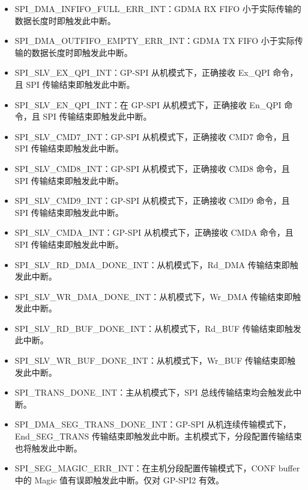 \documentclass[main\_\_CN.tex]{subfiles}
\begin{document}
\begin{itemize}
\item \label{int:SPIINFIFOFULLERRINT}SPI\_DMA\_INFIFO\_FULL\_ERR\_INT：GDMA RX FIFO 小于实际传输的数据长度时即触发此中断。
\item \label{int:SPIOUTFIFOEMPTYERRINT}SPI\_DMA\_OUTFIFO\_EMPTY\_ERR\_INT：GDMA TX FIFO 小于实际传输的数据长度时即触发此中断。

\item \label{int:SPISLVEXQPIINT} SPI\_SLV\_EX\_QPI\_INT：GP-SPI 从机模式下，正确接收 Ex\_QPI 命令，且 SPI 传输结束即触发此中断。
\item \label{int:SPISLVENQPIINT} SPI\_SLV\_EN\_QPI\_INT：在 GP-SPI 从机模式下，正确接收 En\_QPI 命令，且 SPI 传输结束即触发此中断。
\item \label{int:SPISLVCMD7INT} SPI\_SLV\_CMD7\_INT：GP-SPI 从机模式下，正确接收 CMD7 命令，且 SPI 传输结束即触发此中断。
\item \label{int:SPISLVCMD8INT} SPI\_SLV\_CMD8\_INT：GP-SPI 从机模式下，正确接收 CMD8 命令，且 SPI 传输结束即触发此中断。
\item \label{int:SPISLVCMD9INT} SPI\_SLV\_CMD9\_INT：GP-SPI 从机模式下，正确接收 CMD9 命令，且 SPI 传输结束即触发此中断。
\item \label{int:SPISLVCMDAINT} SPI\_SLV\_CMDA\_INT：GP-SPI 从机模式下，正确接收 CMDA 命令，且 SPI 传输结束即触发此中断。

\item \label{int:SPISLVRDDMADONEINT}SPI\_SLV\_RD\_DMA\_DONE\_INT：从机模式下，Rd\_DMA 传输结束即触发此中断。
\item \label{int:SPISLVWRDMADONEINT}SPI\_SLV\_WR\_DMA\_DONE\_INT：从机模式下，Wr\_DMA 传输结束即触发此中断。
\item \label{int:SPISLVRDBUFDONEINT}SPI\_SLV\_RD\_BUF\_DONE\_INT：从机模式下，Rd\_BUF 传输结束即触发此中断。
\item \label{int:SPISLVWRBUFDONEINT}SPI\_SLV\_WR\_BUF\_DONE\_INT：从机模式下，Wr\_BUF 传输结束即触发此中断。

\item \label{int:SPITRANSDONEINT}SPI\_TRANS\_DONE\_INT：主从机模式下，SPI 总线传输结束均会触发此中断。
\item \label{int:SPIDMASEGTRANSDONEINT}SPI\_DMA\_SEG\_TRANS\_DONE\_INT：GP-SPI 从机连续传输模式下，End\_SEG\_TRANS 传输结束即触发此中断。主机模式下，分段配置传输结束也将触发此中断。
\item \label{int:SPISEGMAGICERRINT} SPI\_SEG\_MAGIC\_ERR\_INT：在主机分段配置传输模式下，CONF buffer 中的 Magic 值有误即触发此中断。仅对 GP-SPI2 有效。



\end{itemize}
\end{document}
